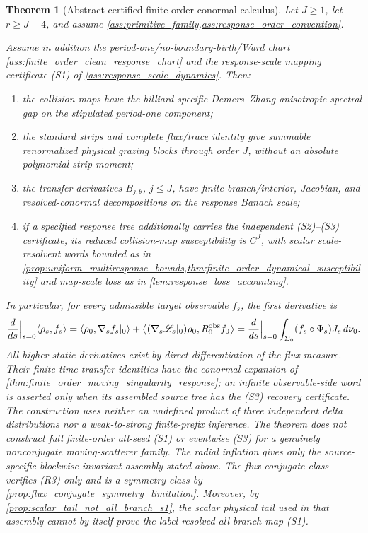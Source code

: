 \documentclass[11pt]{amsart}
\theoremstyle{compactplain}
\newtheorem{theorem}{Theorem}[section]
\theoremstyle{compactdefinition}
\theoremstyle{compactremark}
\newcommand{\Ltransfer}{\mathscr L}
\begin{document}
\begin{theorem}[Abstract certified finite-order conormal calculus]
\label{thm:certified_abstract_conormal_calculus}
Let \(J\ge1\), let \(r\ge J+4\), and assume
\cref{ass:primitive_family,ass:response_order_convention}.

Assume in addition the period-one/no-boundary-birth/Ward chart
\cref{ass:finite_order_clean_response_chart} and the response-scale mapping
certificate (S1) of \cref{ass:response_scale_dynamics}.  Then:
\begin{enumerate}[label=\textup{(\roman*)},wide,labelindent=0pt]
  \item the collision maps have the billiard-specific Demers--Zhang
  anisotropic spectral gap on the stipulated period-one component;
  \item the standard strips and complete flux/trace identity give summable
  renormalized physical grazing blocks through order \(J\), without an
  absolute polynomial strip moment;
  \item the transfer derivatives \(B_{j,\theta}\), \(j\le J\), have finite
  branch/interior, Jacobian, and resolved-conormal decompositions on the
  response Banach scale;
  \item if a specified response tree additionally carries the independent
  (S2)--(S3) certificate, its
  reduced collision-map susceptibility is \(C^J\), with scalar
  scale-resolvent
  words bounded as in
  \cref{prop:uniform_multiresponse_bounds,thm:finite_order_dynamical_susceptibility}
  and map-scale loss as in \cref{lem:response_loss_accounting}.
\end{enumerate}
In particular, for every admissible target observable \(f_s\), the first
derivative is
\[
  \frac d{ds}\Big|_{s=0}\langle\rho_s,f_s\rangle
  =\langle\rho_0,\nabla_s f_s|_0\rangle
  +\left\langle
    (\nabla_s\Ltransfer_s|_0)\rho_0,
    R_0^{\rm obs}f_0
  \right\rangle
  =\frac d{ds}\Big|_{s=0}
    \int_{\Sigma_0}(f_s\circ\Phi_s)J_s\,d\nu_0 .
\]
All higher static derivatives exist by direct differentiation of the flux
measure.  Their finite-time transfer identities have the conormal expansion of
\cref{thm:finite_order_moving_singularity_response}; an infinite
observable-side word is asserted only when its assembled source tree has the
(S3) recovery certificate.  The construction uses neither an undefined product
of three independent delta distributions nor a weak-to-strong finite-prefix
inference.
The theorem does not construct full finite-order all-seed (S1) or eventwise
(S3) for a genuinely
nonconjugate moving-scatterer family.  The radial inflation gives only the
source-specific blockwise invariant assembly stated above.  The flux-conjugate
class verifies (R3) only and is a symmetry class by
\cref{prop:flux_conjugate_symmetry_limitation}.
Moreover, by \cref{prop:scalar_tail_not_all_branch_s1}, the scalar physical
tail used in that assembly cannot by itself prove the label-resolved
all-branch map (S1).
\end{theorem}
\end{document}
